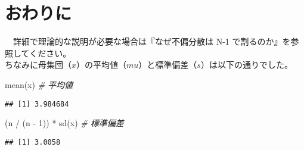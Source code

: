 \documentclass[]{tufte-handout}
\newenvironment{Shaded}{}{}
\newcommand{\CommentTok}[1]{\textcolor[rgb]{0.38,0.63,0.69}{\textit{#1}}}
\newcommand{\DecValTok}[1]{\textcolor[rgb]{0.25,0.63,0.44}{#1}}
\newcommand{\FunctionTok}[1]{\textcolor[rgb]{0.02,0.16,0.49}{#1}}
\newcommand{\NormalTok}[1]{#1}
\newcommand{\SpecialCharTok}[1]{\textcolor[rgb]{0.25,0.44,0.63}{#1}}
\begin{document}
\newpage

\hypertarget{ux304aux308fux308aux306b}{%
\section{\texorpdfstring{\textbf{おわりに}}{おわりに}}\label{ux304aux308fux308aux306b}}

　詳細で理論的な説明が必要な場合は『なぜ不偏分散は N-1
で割るのか』\citep{estpdf82:online}を参照してください。 　\\
ちなみに母集団（\(x\)）の平均値（\(mu\)）と標準偏差（\(s\)）は以下の通りでした。

\begin{Shaded}
\begin{Highlighting}[numbers=left,,]
\FunctionTok{mean}\NormalTok{(x)                }\CommentTok{\# 平均値}
\end{Highlighting}
\end{Shaded}

\begin{verbatim}
## [1] 3.984684
\end{verbatim}

\begin{Shaded}
\begin{Highlighting}[numbers=left,,]
\NormalTok{(n }\SpecialCharTok{/}\NormalTok{ (n }\SpecialCharTok{{-}} \DecValTok{1}\NormalTok{)) }\SpecialCharTok{*} \FunctionTok{sd}\NormalTok{(x)  }\CommentTok{\# 標準偏差}
\end{Highlighting}
\end{Shaded}

\begin{verbatim}
## [1] 3.0058
\end{verbatim}

　


\end{document}
